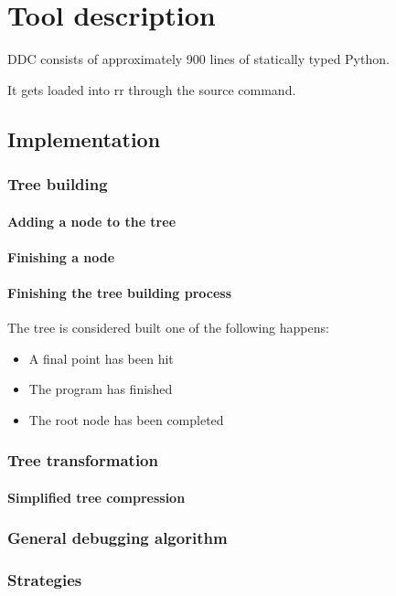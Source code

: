 \chapter{Tool description}
\label{cap:descripcionHerramienta}
DDC consists of approximately 900 lines of statically typed Python.

It gets loaded into rr through the source command.

\section{Implementation}
\subsection{Tree building}
\subsubsection{Adding a node to the tree}

\subsubsection{Finishing a node}
\subsubsection{Finishing the tree building process}
The tree is considered built one of the following happens:
\begin{itemize}
    \item A final point has been hit
    \item The program has finished
    \item The root node has been completed
\end{itemize}
\subsection{Tree transformation}
\subsubsection{Simplified tree compression}
\subsection{General debugging algorithm}
\subsection{Strategies}
